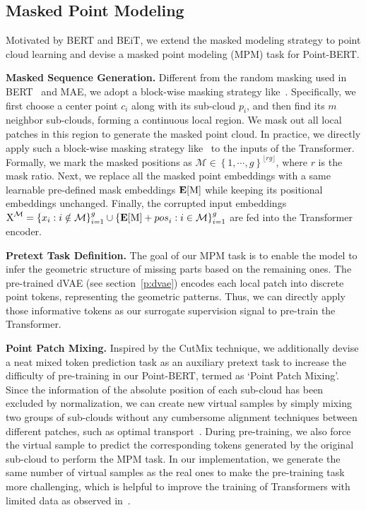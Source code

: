 \documentclass[10pt,twocolumn,letterpaper]{article}
\newcommand{\paragrapha}[2][5pt]{\vspace{#1}\noindent\textbf{#2}}
\begin{document}
\subsection{Masked Point Modeling}

Motivated by BERT\cite{bert} and BEiT\cite{beit}, we extend the masked modeling strategy to point cloud learning and devise a masked point modeling (MPM) task for Point-BERT. 			

\paragrapha{Masked Sequence Generation.}  Different from the random masking used in  BERT~\cite{bert} and MAE\cite{mae}, we adopt a block-wise masking strategy like~\cite{beit}. Specifically, we first choose a center point $c_{i}$ along with its sub-cloud $p_{i}$, and then find its $m$ neighbor sub-clouds, forming a continuous local region. We mask out all local patches in this region to generate the masked point cloud.  In practice, we directly apply such a block-wise masking strategy like~\cite{beit} to the inputs of the Transformer.  Formally, we mark the masked positions as $\mathcal{M}\in \left \{ 1,\cdots ,g \right \}^{\lfloor rg  \rfloor}$, where $r$ is the mask ratio. Next, we replace all the masked point embeddings with a same learnable pre-defined mask embeddings $\mathbf{E}[\textup{M}]$ while keeping its positional embeddings unchanged. Finally, the corrupted input embeddings $
\textup{X}^{\mathcal{M}}=\left \{   x_{i}: i\notin \mathcal{M}   \right \}_{i=1}^{g}   \cup  \left \{ \mathbf{E}[\textup{M}] + {pos}_i :i\in  \mathcal{M} \right \}_{i=1}^{g} $ are fed into the Transformer encoder.

\paragrapha{Pretext Task Definition.}
The goal of our MPM task is to enable the model to infer the geometric structure of missing parts based on the remaining ones.  The pre-trained dVAE (see section~\ref{p:dvae})  encodes each local patch into discrete point tokens,  representing the geometric patterns. Thus, we can directly apply those informative tokens as our surrogate supervision signal to pre-train the Transformer. 
 
 \paragrapha{Point Patch Mixing. } Inspired by the CutMix\cite{cutmix,pointcutmix} technique, we additionally devise a neat mixed token prediction task as an auxiliary pretext task to increase the difficulty of pre-training in our Point-BERT, termed as `Point Patch Mixing'. Since the information of the absolute position of each sub-cloud has been excluded by normalization, we can create new virtual samples by simply mixing two groups of sub-clouds without any cumbersome alignment techniques between different patches, such as optimal transport~\cite{pointcutmix}. During pre-training, we also force the virtual sample to predict the corresponding tokens generated by the original sub-cloud to perform the MPM task. In our implementation, we generate the same number of virtual samples as the real ones to make the pre-training task more challenging, which is helpful to improve the training of Transformers with limited data as observed in~\cite{touvron2021training}.
	
\end{document}
